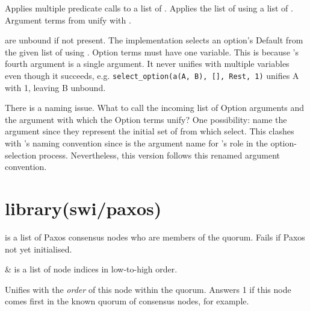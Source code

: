 \begin{description}
Applies multiple  predicate calls to a list of
. Applies the list of  using a list of .
Argument terms from  unify with .

 are unbound if not present. The implementation selects an
option's Default from the given list of  using
. Option terms must have one variable. This is
because 's fourth argument is a single argument. It
never unifies with multiple variables even though it succeeds, e.g.
\verb$select_option(a(A, B), [], Rest, 1)$ unifies A with 1, leaving B
unbound.

There is a naming issue. What to call the incoming list of Option
arguments and the  argument with which the Option terms
unify? One possibility: name the  argument  since
they represent the initial set of  from which 
select. This clashes with 's naming convention since
 is the argument name for 's role in the
option-selection process. Nevertheless, this version follows this
renamed argument convention.
\end{description}

\chapter{library(swi/paxos)}\label{sec:paxos}

\begin{description}
 is a list of Paxos consensus nodes who are members of the
quorum. Fails if Paxos not yet initialised.

\begin{arguments}
 & is a list of node indices in low-to-high order. \\
\end{arguments}

Unifies  with the \textit{order} of this node within the quorum.
Answers 1 if this node comes first in the known quorum of
consensus nodes, for example.
\end{description}

